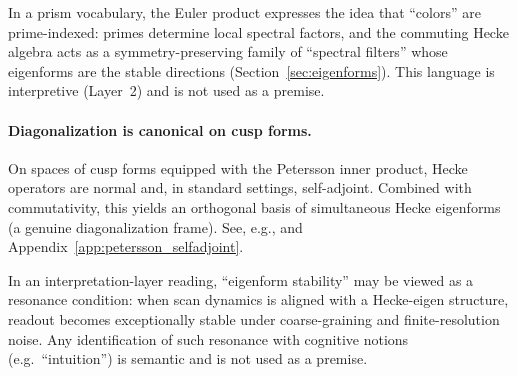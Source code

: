 \begin{remark}
In a prism vocabulary, the Euler product expresses the idea that ``colors'' are prime-indexed: primes determine local spectral factors, and the commuting Hecke algebra acts as a symmetry-preserving family of ``spectral filters'' whose eigenforms are the stable directions (Section~\ref{sec:eigenforms}). This language is interpretive (Layer~2) and is not used as a premise.
\end{remark}

\paragraph{Diagonalization is canonical on cusp forms.}
On spaces of cusp forms equipped with the Petersson inner product, Hecke operators are normal and, in standard settings, self-adjoint. Combined with commutativity, this yields an orthogonal basis of simultaneous Hecke eigenforms (a genuine diagonalization frame). See, e.g., \cite{Serre1973,DiamondShurman2005} and Appendix~\ref{app:petersson_selfadjoint}.

\begin{remark}
In an interpretation-layer reading, ``eigenform stability'' may be viewed as a resonance condition: when scan dynamics is aligned with a Hecke-eigen structure, readout becomes exceptionally stable under coarse-graining and finite-resolution noise. Any identification of such resonance with cognitive notions (e.g.\ ``intuition'') is semantic and is not used as a premise.
\end{remark}


